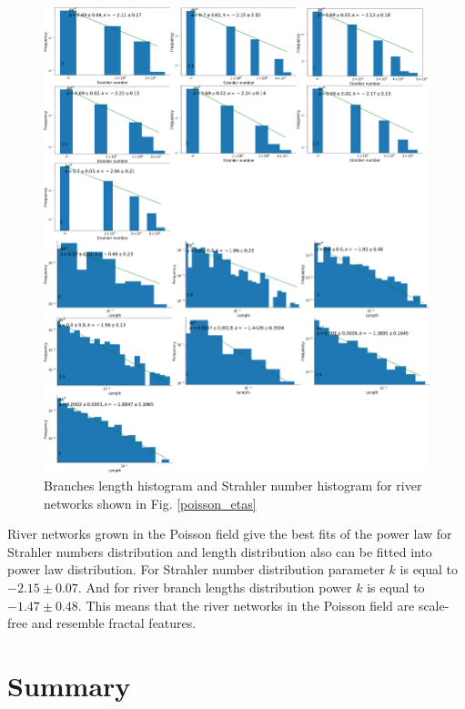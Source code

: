 \documentclass[]{pracamgr}
\begin{document}
        \begin{figure}[H]
          \centering
          \includegraphics[width=1\textwidth]{figs/sims/strahler_and_leght_histogram_for_poisson_field.png}        
          \caption{Branches length histogram and Strahler number histogram for river networks shown in Fig. \ref{poisson_etas}}
          \label{poisson_etas_analysis}
        \end{figure}

        River networks grown in the Poisson field give the best fits of the power law for Strahler numbers distribution and length distribution also can be fitted into power law distribution. For Strahler number distribution parameter $k$ is equal to $-2.15 \pm 0.07$. And for river branch lengths distribution power $k$ is equal to $-1.47 \pm 0.48$. This means that the river networks in the Poisson field are scale-free and resemble fractal features.


  \chapter{Summary}
\end{document}
